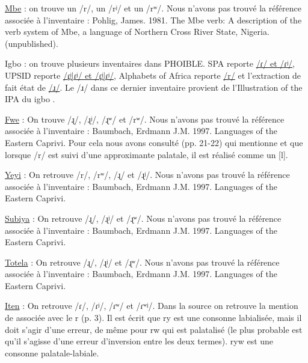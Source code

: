 \begin{exe}
\begin{xlist}
	\ex \href{https://phoible.org/inventories/view/1599}{Mbe}  : on trouve un /r/, un /rʲ/ et un /rʷ/. Nous n'avons pas trouvé la référence associée à l'inventaire : Pohlig, James. 1981. The Mbe verb: A description of the verb system of Mbe, a language of Northern Cross River State, Nigeria. (unpublished).
	
	\ex Igbo  : on trouve plusieurs inventaires dans PHOIBLE. SPA reporte \href{https://phoible.org/inventories/view/143}{/ɾ/ et /ɾʲ/}, UPSID reporte \href{https://phoible.org/inventories/view/365}{/ɾ̪ʲ|ɾʲ/ et /ɾ̪ʲ|ɾʲ/}, Alphabets of Africa reporte \href{https://phoible.org/inventories/view/732}{/r/} et l'extraction de \textcite{moran_etal2014} fait état de \href{https://phoible.org/inventories/view/2192}{/ɹ/}. Le /ɹ/ dans ce dernier inventaire provient de l'Illustration of the IPA du igbo \parencite{ikekeonwuIgbo1991}.
	
	\ex \href{https://phoible.org/inventories/view/852}{Fwe}  : On trouve /ɻ/, /ɻʲ/, /ɻʷ/ et /rʷ/. Nous n'avons pas trouvé la référence associée à l'inventaire : Baumbach, Erdmann J.M. 1997. Languages of the Eastern Caprivi. Pour cela nous avons consulté \textcite{gunninkGrammarFweBantu2018} (pp. 21-22) qui mentionne  et que lorsque /r/ est suivi d'une approximante palatale, il est réalisé comme un [l].
	
	\ex \href{https://phoible.org/inventories/view/853}{Yeyi}  : On retrouve /r/, /rʷ/, /ɻ/ et /ɻʲ/. Nous n'avons pas trouvé la référence associée à l'inventaire : Baumbach, Erdmann J.M. 1997. Languages of the Eastern Caprivi.
	
	\ex \href{https://phoible.org/inventories/view/1202}{Subiya}  : On retrouve /ɻ/, /ɻʲ/ et /ɻʷ/. Nous n'avons pas trouvé la référence associée à l'inventaire : Baumbach, Erdmann J.M. 1997. Languages of the Eastern Caprivi.
	
	\ex \href{https://phoible.org/inventories/view/1203}{Totela}  : On retrouve /ɻ/, /ɻʲ/ et /ɻʷ/. Nous n'avons pas trouvé la référence associée à l'inventaire : Baumbach, Erdmann J.M. 1997. Languages of the Eastern Caprivi.
	
	\ex \href{https://phoible.org/inventories/view/1533}{Iten}  : On retrouve /ɾ/, /ɾʲ/, /ɾʷ/ et /ɾʷʲ/. Dans la source \textcite{blenchItenConsonantAlternation2010} on retrouve la mention de  associée avec le r (p. 3). Il est écrit que ry est une consonne labialisée, mais il doit s'agir d'une erreur, de même pour rw qui est palatalisé (le plus probable est qu'il s'agisse d'une erreur d'inversion entre les deux termes). ryw est une consonne palatale-labiale.
	\end{xlist}
\end{exe}


